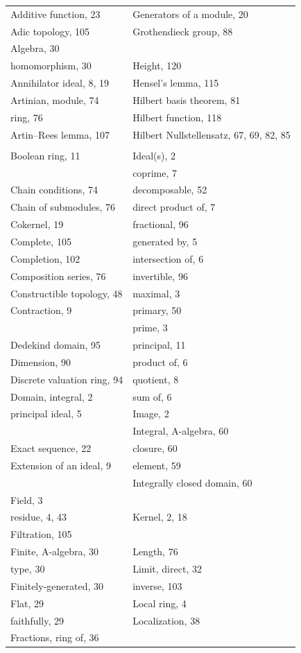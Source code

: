 \begin{tabular}{@{}ll@{}}
Additive function, 23 & Generators of a module, 20\\
Adic topology, 105 & Grothendieck group, 88\\
Algebra, 30 & \\
\quad homomorphism, 30 & Height, 120\\
Annihilator ideal, 8, 19 & Hensel's lemma, 115\\
Artinian, module, 74 & Hilbert basis theorem, 81\\
\quad ring, 76 & Hilbert function, 118\\
Artin--Rees lemma, 107 & Hilbert Nullstellensatz, 67, 69, 82, 85\\
&\\
Boolean ring, 11 & Ideal(s), 2\\
&\quad coprime, 7\\
Chain conditions, 74 &\quad decomposable, 52\\
Chain of submodules, 76 &\quad direct product of, 7\\
Cokernel, 19 &\quad fractional, 96\\
Complete, 105 &\quad generated by, 5\\
Completion, 102 &\quad intersection of, 6\\
Composition series, 76 &\quad invertible, 96\\
Constructible topology, 48 &\quad maximal, 3\\
Contraction, 9 &\quad primary, 50\\
&\quad prime, 3\\
Dedekind domain, 95 &\quad principal, 11\\
Dimension, 90 &\quad product of, 6\\
Discrete valuation ring, 94 &\quad quotient, 8\\
Domain, integral, 2 &\quad sum of, 6\\
\quad principal ideal, 5 & Image, 2\\
& Integral, A-algebra, 60\\
Exact sequence, 22 &\quad closure, 60\\
Extension of an ideal, 9 &\quad element, 59\\
& Integrally closed domain, 60\\
Field, 3 &\\
\quad residue, 4, 43 & Kernel, 2, 18\\
Filtration, 105 &\\
Finite, A-algebra, 30 & Length, 76\\
\quad type, 30 & Limit, direct, 32\\
Finitely-generated, 30 &\quad inverse, 103\\
Flat, 29 & Local ring, 4\\
\quad faithfully, 29 & Localization, 38\\
Fractions, ring of, 36 &
\end{tabular}
